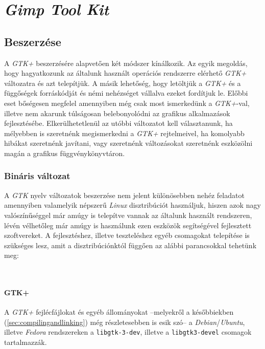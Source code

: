 \section{\textit{Gimp Tool Kit}}

\subsection{Beszerzése}

A \textit{GTK+} beszerzésére alapvetően két módszer kínálkozik. Az egyik megoldás, hogy hagyatkozunk az általunk használt operációs rendszerre elérhető \textit{GTK+} változatra és azt telepítjük. A másik lehetőség, hogy letöltjük a \textit{GTK+} és a függőségek forráskódját és némi nehézséget vállalva ezeket fordítjuk le. Előbbi eset bőségesen megfelel amennyiben még csak most ismerkedünk a \textit{GTK+}-val, illetve nem akarunk túlságosan belebonyolódni az grafikus alkalmazások fejlesztésébe. Elkerülhetetlenül az utóbbi változatot kell választanunk, ha mélyebben is szeretnénk megismerkedni a \textit{GTK+} rejtelmeivel, ha komolyabb hibákat szeretnénk javítani, vagy szeretnénk változásokat szeretnénk eszközölni magán a grafikus függvénykönyvtáron.

\subsubsection{Bináris változat}

A \textit{GTK} nyelv változatok beszerzése nem jelent különösebben nehéz feladatot amennyiben valamelyik népszerű \textit{Linux} disztribúciót használjuk, hiszen azok nagy valószínűséggel már amúgy is telepítve vannak az általunk használt rendszeren, lévén vélhetőleg már amúgy is használunk ezen eszközök segítségével fejlesztett szoftvereket. A fejlesztéshez, illetve teszteléshez egyéb csomagokat telepítése is szükséges lesz, amit a disztribúciónktól függően az alábbi parancsokkal tehetünk meg:

\\

\paragraph{GTK+}

A \textit{GTK+} fejlécfájlokat és egyéb állományokat --melyekről a későbbiekben (\ref{sec:compilingandlinking}) még részletesebben is esik szó-- a \textit{Debian}/\textit{Ubuntu}, illetve \textit{Fedora} rendszereken a \texttt{libgtk-3-dev}, illetve a \texttt{libgtk3-devel} csomagok tartalmazzák.

